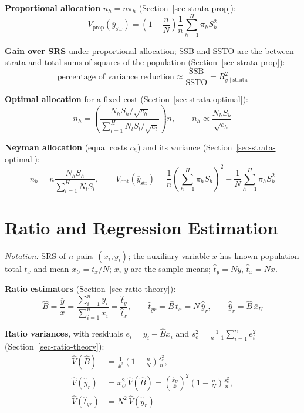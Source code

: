 \documentclass[
  letterpaper,
  DIV=11,
  numbers=noendperiod]{scrreprt}
\renewcommand{\[}{\begin{equation}}
\renewcommand{\]}{\end{equation}}
\begin{document}
\textbf{Proportional allocation} \(n_h = n\pi_h\)
(Section~\ref{sec-strata-prop}): \[
\boxed{V_{\text{prop}}(\overline y_{\text{str}}) = \left(1 - \frac{n}{N}\right)\frac{1}{n}\sum_{h=1}^H \pi_h S_h^2}
\]

\textbf{Gain over SRS} under proportional allocation; SSB and SSTO are
the between-strata and total sums of squares of the population
(Section~\ref{sec-strata-prop}): \[
\boxed{\text{percentage of variance reduction} \approx \frac{\text{SSB}}{\text{SSTO}} = R^2_{y\mid\text{strata}}}
\]

\textbf{Optimal allocation} for a fixed cost
(Section~\ref{sec-strata-optimal}): \[
\boxed{
n_h = \left(\frac{N_hS_h/\sqrt{c_h}}{\sum_{l=1}^H N_lS_l/\sqrt{c_l}}\right)n,
\qquad n_h \propto \frac{N_hS_h}{\sqrt{c_h}}}
\]

\textbf{Neyman allocation} (equal costs \(c_h\)) and its variance
(Section~\ref{sec-strata-optimal}): \[
\boxed{n_h = n \frac{N_h S_h}{\sum_{l=1}^H N_l S_l}}, \qquad
\boxed{V_{\text{opt}}(\overline{y}_{\text{str}}) = \frac{1}{n}\left(\sum_{h=1}^H \pi_h S_h\right)^2 - \frac{1}{N}\sum_{h=1}^H \pi_h S_h^2}
\]

\section{Ratio and Regression
Estimation}\label{ratio-and-regression-estimation-1}

\emph{Notation:} SRS of \(n\) pairs \((x_i, y_i)\); the auxiliary
variable \(x\) has known population total \(t_x\) and mean
\(\bar x_U = t_x/N\); \(\bar x\), \(\bar y\) are the sample means;
\(\hat t_y = N\bar y\), \(\hat t_x = N\bar x\).

\textbf{Ratio estimators} (Section~\ref{sec-ratio-theory}): \[
\boxed{\hat B = \frac{\bar y}{\bar x} = \frac{\sum_{i=1}^n y_i}{\sum_{i=1}^n x_i} = \frac{\hat t_y}{\hat t_x},
\qquad
\hat t_{yr} = \hat B\, t_x = N\,\hat{\bar y}_r,
\qquad
\hat{\bar y}_r = \hat B\, \bar x_U}
\]

\textbf{Ratio variances}, with residuals \(e_i = y_i - \hat B x_i\) and
\(s_e^2 = \frac{1}{n-1}\sum_{i=1}^n e_i^2\)
(Section~\ref{sec-ratio-theory}): \[
\boxed{\begin{aligned}
\hat V(\hat B) &= \frac{1}{\bar x^2}\left(1 - \frac nN\right)\frac{s_e^2}{n}, \\
\hat V(\hat{\bar y}_r) &= \bar x_U^2\,\hat V(\hat B) = \left(\frac{\bar x_U}{\bar x}\right)^2\left(1 - \frac nN\right)\frac{s_e^2}{n}, \\
\hat V(\hat t_{yr}) &= N^2\,\hat V(\hat{\bar y}_r)
\end{aligned}}
\]
\end{document}
